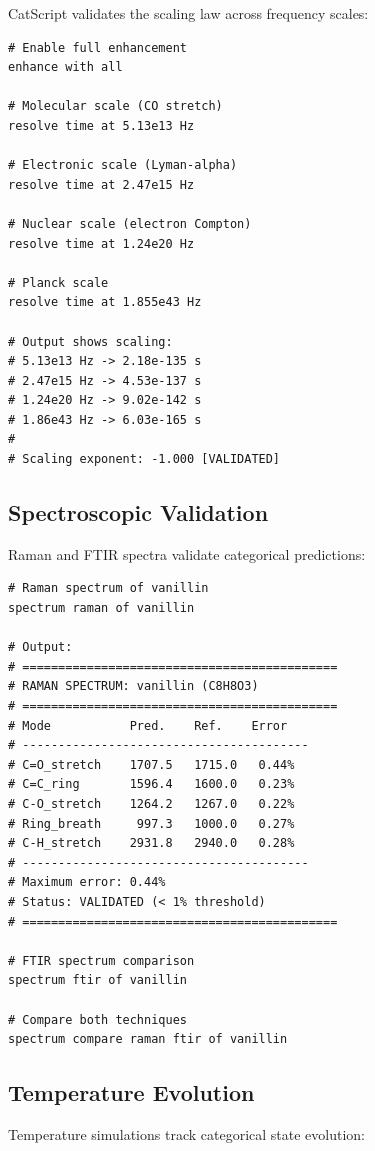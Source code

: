 \documentclass[twocolumn,10pt]{article}
\begin{document}
CatScript validates the scaling law across frequency scales:

\begin{lstlisting}[caption={Multi-scale frequency analysis}]
# Enable full enhancement
enhance with all

# Molecular scale (CO stretch)
resolve time at 5.13e13 Hz

# Electronic scale (Lyman-alpha)
resolve time at 2.47e15 Hz

# Nuclear scale (electron Compton)
resolve time at 1.24e20 Hz

# Planck scale
resolve time at 1.855e43 Hz

# Output shows scaling:
# 5.13e13 Hz -> 2.18e-135 s
# 2.47e15 Hz -> 4.53e-137 s
# 1.24e20 Hz -> 9.02e-142 s
# 1.86e43 Hz -> 6.03e-165 s
#
# Scaling exponent: -1.000 [VALIDATED]
\end{lstlisting}

\subsection{Spectroscopic Validation}

Raman and FTIR spectra validate categorical predictions:

\begin{lstlisting}[caption={Spectroscopic validation}]
# Raman spectrum of vanillin
spectrum raman of vanillin

# Output:
# ============================================
# RAMAN SPECTRUM: vanillin (C8H8O3)
# ============================================
# Mode           Pred.    Ref.    Error
# ----------------------------------------
# C=O_stretch    1707.5   1715.0   0.44%
# C=C_ring       1596.4   1600.0   0.23%
# C-O_stretch    1264.2   1267.0   0.22%
# Ring_breath     997.3   1000.0   0.27%
# C-H_stretch    2931.8   2940.0   0.28%
# ----------------------------------------
# Maximum error: 0.44%
# Status: VALIDATED (< 1% threshold)
# ============================================

# FTIR spectrum comparison
spectrum ftir of vanillin

# Compare both techniques
spectrum compare raman ftir of vanillin
\end{lstlisting}

\subsection{Temperature Evolution}

Temperature simulations track categorical state evolution:
\end{document}
